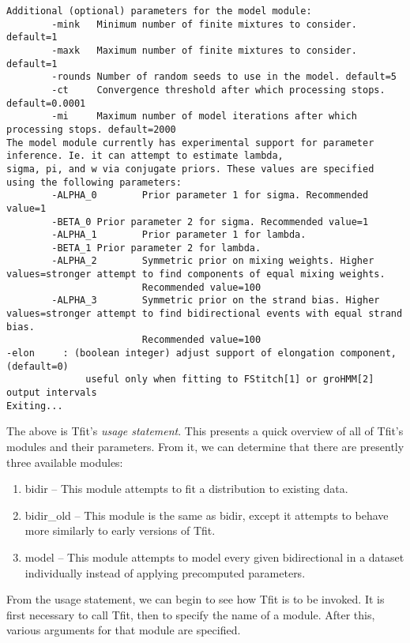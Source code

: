\documentclass[12pt,letterpaper]{article}
\begin{document}
\begin{verbatim}
Additional (optional) parameters for the model module:
        -mink   Minimum number of finite mixtures to consider. default=1
        -maxk   Maximum number of finite mixtures to consider. default=1
        -rounds Number of random seeds to use in the model. default=5
        -ct     Convergence threshold after which processing stops. default=0.0001
        -mi     Maximum number of model iterations after which processing stops. default=2000
The model module currently has experimental support for parameter inference. Ie. it can attempt to estimate lambda,
sigma, pi, and w via conjugate priors. These values are specified using the following parameters:
        -ALPHA_0        Prior parameter 1 for sigma. Recommended value=1
        -BETA_0 Prior parameter 2 for sigma. Recommended value=1
        -ALPHA_1        Prior parameter 1 for lambda.
        -BETA_1 Prior parameter 2 for lambda.
        -ALPHA_2        Symmetric prior on mixing weights. Higher values=stronger attempt to find components of equal mixing weights.
                        Recommended value=100
        -ALPHA_3        Symmetric prior on the strand bias. Higher values=stronger attempt to find bidirectional events with equal strand bias.
                        Recommended value=100
-elon     : (boolean integer) adjust support of elongation component, (default=0)
              useful only when fitting to FStitch[1] or groHMM[2] output intervals
Exiting...
\end{verbatim}

The above is Tfit's \textit{usage statement}. This presents a quick overview of all of Tfit's modules and their parameters. From it, we can determine that there are presently three available modules:
\begin{enumerate}
\item bidir -- This module attempts to fit a distribution to existing data.
\item bidir\_old -- This module is the same as bidir, except it attempts to behave more similarly to early versions of Tfit.
\item model -- This module attempts to model every given bidirectional in a dataset individually instead of applying precomputed parameters.
\end{enumerate}

From the usage statement, we can begin to see how Tfit is to be invoked. It is first necessary to call Tfit, then to specify the name of a module. After this, various arguments for that module are specified.
\end{document}
